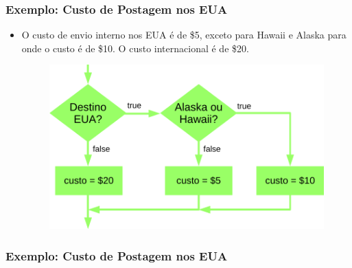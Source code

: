\documentclass[xcolor={dvipsnames,table},aspectratio=169]{beamer}
\begin{document}
\begin{frame}\frametitle{Exemplo: Custo de Postagem nos EUA}
\begin{itemize}
	\item O custo de envio interno nos EUA é de \$5, exceto para Hawaii e Alaska para onde o custo é de \$10. O custo internacional é de \$20.
\begin{figure}[h]
	\includegraphics[height=0.50\paperheight,center]{pucrs-ep-fprog-unidade_03-decisoes-laminas-fluxograma_postagem_eua.png}
\end{figure}
\end{itemize}
\end{frame}

\begin{frame}[fragile]\frametitle{Exemplo: Custo de Postagem nos EUA}
\tiny{\inputminted[bgcolor=cyan!10]{java}{src/PostagemEUA.java}}		
\end{frame}
\end{document}
